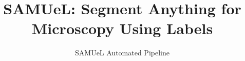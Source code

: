 \documentclass{article}
\begin{document}
\title{SAMUeL: Segment Anything for Microscopy Using Labels}
\author{SAMUeL Automated Pipeline}
\maketitle







\end{document}
